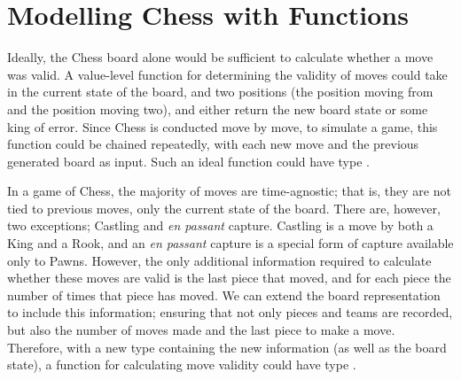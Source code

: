 
\section{Modelling Chess with Functions} \label{chesswithfunctions}

Ideally, the Chess board alone would be sufficient to calculate whether a move was valid. A value-level function for determining the validity of moves could take in the current state of the board, and two positions (the position moving from and the position moving two), and either return the new board state or some king of error. Since Chess is conducted move by move, to simulate a game, this function could be chained repeatedly, with each new move and the previous generated board as input. Such an ideal function could have type .

In a game of Chess, the majority of moves are time-agnostic; that is, they are not tied to previous moves, only the current state of the board. There are, however, two exceptions; Castling and \emph{en passant} capture. Castling is a move by both a King and a Rook, and an \emph{en passant} capture is a special form of capture available only to Pawns. However, the only additional information required to calculate whether these moves are valid is the last piece that moved, and for each piece the number of times that piece has moved. We can extend the board representation to include this information; ensuring that not only pieces and teams are recorded, but also the number of moves made and the last piece to make a move. Therefore, with a new type  containing the new information (as well as the board state), a function for calculating move validity could have type .

